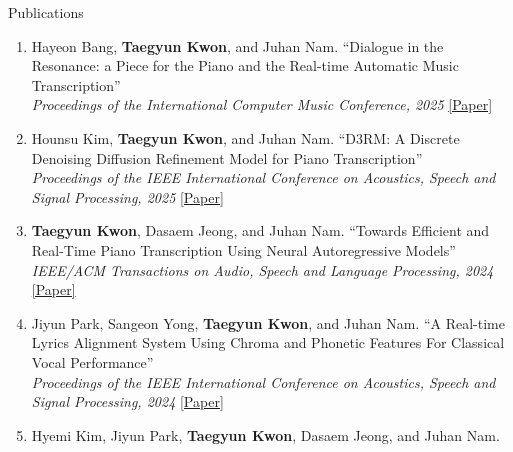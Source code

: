 \begin{rSection}{Publications}
\begin{enumerate}
\begin{minipage}[t]{\linewidth}
``Predicting Flutist Onset Timing in Duet Performance: A Multimodal Analysis of Gesture and Breath Cues''\\\textit{Proceedings of the 26th International Society for Music Information Retrieval Conference, 2025}
\href{https://ismir2025program.ismir.net/poster_105.html}{[Paper]}
\end{minipage}
\item \begin{minipage}[t]{\linewidth}Hayeon Bang, \textbf{Taegyun Kwon}, and Juhan Nam.
``Dialogue in the Resonance: a Piece for the Piano and the Real-time Automatic Music Transcription''\\\textit{Proceedings of the International Computer Music Conference, 2025}
\href{https://arxiv.org/abs/2505.16259}{[Paper]}
\end{minipage}
\item \begin{minipage}[t]{\linewidth}Hounsu Kim, \textbf{Taegyun Kwon}, and Juhan Nam.
``D3RM: A Discrete Denoising Diffusion Refinement Model for Piano Transcription''\\\textit{Proceedings of the IEEE International Conference on Acoustics, Speech and Signal Processing, 2025}
\href{https://arxiv.org/abs/2501.05068}{[Paper]}
\end{minipage}
\item \begin{minipage}[t]{\linewidth}\textbf{Taegyun Kwon}, Dasaem Jeong, and Juhan Nam.
``Towards Efficient and Real-Time Piano Transcription Using Neural Autoregressive Models''\\\textit{IEEE/ACM Transactions on Audio, Speech and Language Processing, 2024}
\href{https://ieeexplore.ieee.org/document/10769033}{[Paper]}
\end{minipage}
\item \begin{minipage}[t]{\linewidth}Jiyun Park, Sangeon Yong, \textbf{Taegyun Kwon}, and Juhan Nam.
``A Real-time Lyrics Alignment System Using Chroma and Phonetic Features For Classical Vocal Performance''\\\textit{Proceedings of the IEEE International Conference on Acoustics, Speech and Signal Processing, 2024}
\href{https://ieeexplore.ieee.org/document/10445926}{[Paper]}
\end{minipage}
\item \begin{minipage}[t]{\linewidth}Hyemi Kim, Jiyun Park, \textbf{Taegyun Kwon}, Dasaem Jeong, and Juhan Nam.

\end{minipage}
\end{enumerate}
\end{rSection}
